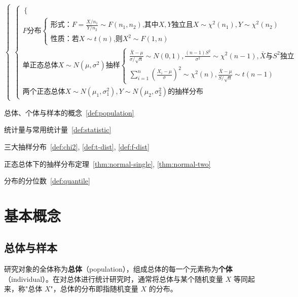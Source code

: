 \documentclass[lang=cn,11pt]{elegantbook}
\begin{document}
\[\begin{cases}
\begin{cases}
\begin{cases}
\end{cases} \\[6pt]
F\text{分布}
\begin{cases}
\text{形式：}F=\displaystyle\frac{X/n_1}{Y/n_2}\sim F(n_1,n_2)\text{,其中}X,Y\text{独立且}X\sim\chi^2(n_1),Y\sim\chi^2(n_2) \\[6pt]
\text{性质：若}X\sim t(n)\text{,则}X^2\sim F(1,n)
\end{cases} \\[6pt]
\text{单正态总体}X\sim N(\mu,\sigma^2)\text{抽样}
\begin{cases}
\displaystyle\frac{\bar{X}-\mu}{\sigma/\sqrt{n}}\sim N(0,1),\frac{(n-1)S^2}{\sigma^2}\sim\chi^2(n-1),\bar{X}\text{与}S^2\text{独立}\\
\displaystyle\sum_{i=1}^n\left(\frac{X_i-\mu}{\sigma}\right)^2\sim\chi^2(n),\frac{\bar{X}-\mu}{S/\sqrt{n}}\sim t(n-1)
\end{cases} \\[6pt]
\text{两个正态总体}X\sim N(\mu_1,\sigma_1^2),Y\sim N(\mu_2,\sigma_2^2)\text{的抽样分布}
\end{cases}
\end{cases}
\]

\begin{introduction}
    \item 总体、个体与样本的概念~\ref{def:population}
    \item 统计量与常用统计量~\ref{def:statistic}
    \item 三大抽样分布~\ref{def:chi2}, \ref{def:t-dist}, \ref{def:f-dist}
    \item 正态总体下的抽样分布定理~\ref{thm:normal-single}, \ref{thm:normal-two}
    \item 分布的分位数~\ref{def:quantile}
\end{introduction}

\section{基本概念}

\subsection{总体与样本}

\begin{definition}[总体与个体] \label{def:population}
研究对象的全体称为\textbf{总体}（population），组成总体的每一个元素称为\textbf{个体}（individual）。在对总体进行统计研究时，通常将总体与某个随机变量 \(X\) 等同起来，称"总体 \(X\)"，总体的分布即指随机变量 \(X\) 的分布。
\end{definition}
\end{document}
